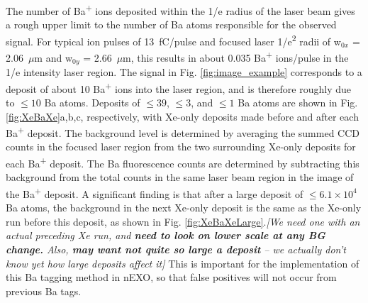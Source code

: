 \documentclass[aps,pra,reprint,superscriptaddress]{revtex4-1}
\begin{document}



The number of Ba\textsuperscript{+} ions deposited within the 1/e radius of the laser beam gives a rough upper limit to the number of Ba atoms responsible for the observed signal.  For typical ion pulses of 13~fC/pulse and focused laser 1/e\textsuperscript{2} radii of w$_{0x}$ = 2.06~$\mu$m and w$_{0y}$ = 2.66~$\mu$m, this results in about 0.035 Ba\textsuperscript{+} ions/pulse in the 1/e intensity laser region.  The signal in Fig. \ref{fig:image_example} corresponds to a deposit of about 10 Ba\textsuperscript{+} ions into the laser region, and is therefore roughly due to $\leq 10$ Ba atoms.  Deposits of $\leq 39$, $\leq 3$, and $\leq 1$ Ba atoms are shown in Fig. \ref{fig:XeBaXe}a,b,c, respectively, with Xe-only deposits made before and after each Ba\textsuperscript{+} deposit.  The background level is determined by averaging the summed CCD counts in the focused laser region from the two surrounding Xe-only deposits for each Ba\textsuperscript{+} deposit.  The Ba fluorescence counts are determined by subtracting this background from the total counts in the same laser beam region in the image of the Ba\textsuperscript{+} deposit.  A significant finding is that {\color{gray}after a large deposit of $\leq 6.1 \times 10^4$ Ba atoms, the background in the next Xe-only deposit is the same as the Xe-only run before this deposit, as shown in Fig. \ref{fig:XeBaXeLarge}.\emph{[We need one with an actual preceding Xe run, and \textbf{need to look on lower scale at any BG change.} Also, \textbf{may want not quite so large a deposit} -- we actually don't know yet how large deposits affect it]}}  This is important for the implementation of this Ba tagging method in nEXO, so that false positives will not occur from previous Ba tags.
\end{document}
